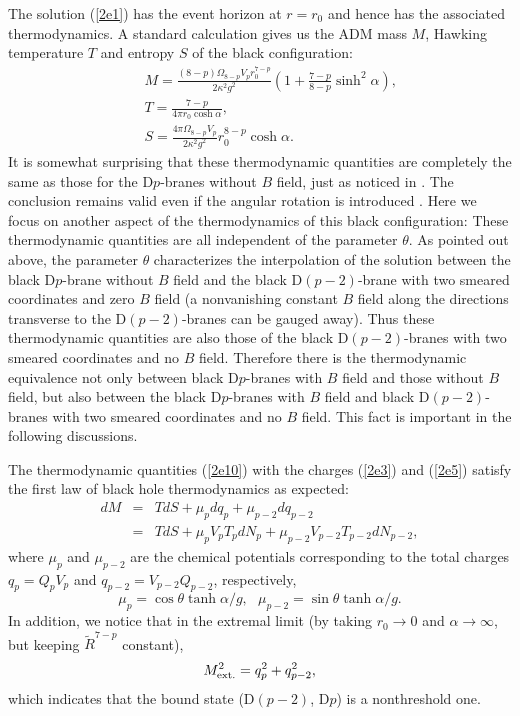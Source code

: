 \documentclass[a4paper,12pt]{article}
\begin{document}
The solution (\ref{2e1}) has the event horizon at $r=r_0$ and hence has the
associated thermodynamics. A standard calculation gives us the ADM mass $M$,
Hawking temperature $T$ and entropy $S$ of the black configuration:
\begin{eqnarray}
&& M=\frac{(8-p)\Omega_{8-p}V_p r_0^{7-p}}{2\kappa^2g^2}\left(1
     +\frac{7-p}{8-p}\sinh^2\alpha \right), \nonumber \\
&& T=\frac{7-p}{4\pi r_0\cosh\alpha}, \nonumber \\
\label{2e10}
&& S=\frac{4\pi \Omega_{8-p}V_p}{2\kappa^2g^2}r_0^{8-p}\cosh\alpha.
\end{eqnarray}
It is somewhat surprising that these thermodynamic quantities are completely
the same as those for the D$p$-branes without $B$ field, just as noticed in
\cite{Mald1,Ali,Bar,CO,Harmark}. The conclusion remains valid even if the
angular rotation is introduced \cite{Harmark}. Here we focus on another
aspect of the thermodynamics of this black configuration: These
thermodynamic quantities are all independent of the parameter $\theta$.
As pointed out above, the parameter $\theta$ characterizes the interpolation
of the solution between the black D$p$-brane without $B$ field and the black
D$(p-2)$-brane with two smeared coordinates and zero $B$ field (a
nonvanishing constant $B$ field along the directions transverse to the
D$(p-2)$-branes can be gauged away). Thus these thermodynamic quantities are
also those of the black D$(p-2)$-branes with two smeared coordinates and no
$B$ field. Therefore there is the thermodynamic equivalence not only between
black D$p$-branes with $B$ field and those without $B$ field, but also
between the black D$p$-branes with $B$ field and black D$(p-2)$-branes with
two smeared coordinates and no $B$ field. This fact is important in the
following discussions.

The thermodynamic quantities (\ref{2e10}) with the charges (\ref{2e3}) and
(\ref{2e5}) satisfy the first law of black hole thermodynamics as expected:
\begin{eqnarray}
\label{first}
dM &=& TdS + \mu_pdq_p +\mu_{p-2}dq_{p-2} \nonumber \\
   &=& TdS +\mu_pV_pT_pdN_p +\mu_{p-2}V_{p-2}T_{p-2}dN_{p-2},
\end{eqnarray}
where $\mu_p$ and $\mu_{p-2}$ are the chemical potentials corresponding
to the total charges $q_p= Q_pV_p$ and $q_{p-2}=V_{p-2}Q_{p-2}$, respectively,
\begin{equation}
\mu_p= \cos\theta \tanh\alpha/g, \ \ \ \mu_{p-2}=\sin\theta \tanh \alpha/g.
\end{equation}
In addition, we notice that in the extremal limit (by taking $r_0
\rightarrow 0$ and $\alpha \rightarrow \infty$, but keeping
$\tilde{R}^{7-p}$ constant),
\begin{equation}
M^2_{\rm ext.}= q_p^2 +q_{p-2}^2,
\end{equation}
which indicates that the bound state (D$(p-2)$, D$p$) is a nonthreshold one.
\end{document}
